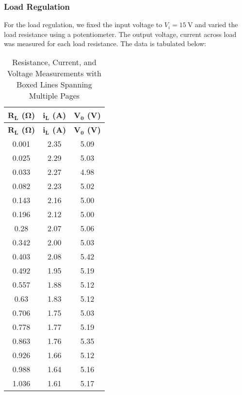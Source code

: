 \documentclass{scrartcl}
\begin{document}
\subsubsection{Load Regulation}
For the load regulation, we fixed the input voltage to $V_i = 15 \ \mathrm{V}$ and varied the load resistance using a potentiometer. The output voltage, current across load was measured for each load resistance. The data is tabulated below:
\begin{longtable}{|c|c|c|}
        \caption{Resistance, Current, and Voltage Measurements with Boxed Lines Spanning Multiple Pages} \\ 
        \hline
        \textbf{$\mathbf{R_L}$ ($\mathbf{\Omega}$)} & \textbf{$\mathbf{i_L}$ (A)} & \textbf{$\mathbf{V_0}$ (V)} \\ \hline
        \endfirsthead
        
        \hline
        \textbf{$\mathbf{R_L}$ ($\mathbf{\Omega}$)} & \textbf{$\mathbf{i_L}$ (A)} & \textbf{$\mathbf{V_0}$ (V)} \\ \hline
        \endhead
        
        \hline
        \endfoot
        
        \hline
        \endlastfoot
        
        0.001      & 2.35      & 5.09 \\ \hline
        0.025      & 2.29      & 5.03 \\ \hline
        0.033      & 2.27      & 4.98 \\ \hline
        0.082      & 2.23      & 5.02 \\ \hline
        0.143      & 2.16      & 5.00 \\ \hline
        0.196      & 2.12      & 5.00 \\ \hline
        0.28       & 2.07      & 5.06 \\ \hline
        0.342      & 2.00      & 5.03 \\ \hline
        0.403      & 2.08      & 5.42 \\ \hline
        0.492      & 1.95      & 5.19 \\ \hline
        0.557      & 1.88      & 5.12 \\ \hline
        0.63       & 1.83      & 5.12 \\ \hline
        0.706      & 1.75      & 5.03 \\ \hline
        0.778      & 1.77      & 5.19 \\ \hline
        0.863      & 1.76      & 5.35 \\ \hline
        0.926      & 1.66      & 5.12 \\ \hline
        0.988      & 1.64      & 5.16 \\ \hline
        1.036      & 1.61      & 5.17 \\ \hline
        
        \end{longtable}
\end{document}
